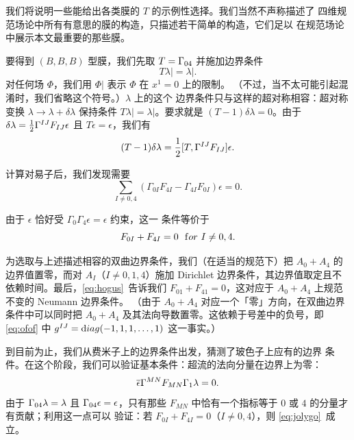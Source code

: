 我们将说明一些能给出各类膜的 $T$ 的示例性选择。我们当然不声称描述了
四维规范场论中所有有意思的膜的构造，只描述若干简单的构造，它们足以
在规范场论中展示本文最重要的那些膜。

要得到 $(B,B,B)$ 型膜，我们先取 $T=\G_{04}$ 并施加边界条件 %
\setcounter{equation}{8}
\begin{equation}\label{eq:unvu}
T\lambda\vert
=\lambda\vert.
\end{equation}
 对任何场 $\Phi$，我们用 $\Phi|$ 表示 $\Phi$ 在 $x^1=0$ 上的限制。
（不过，当不太可能引起混淆时，我们省略这个符号。）$\lambda$ 上的这个
边界条件只与这样的超对称相容：超对称变换
$\lambda\to \lambda+\delta\lambda$ 保持条件
$T\lambda\vert=\lambda\vert$。要求就是 $(T-1)\delta\lambda=0$。由于
$\delta\lambda=\half\G^{IJ}F_{IJ}\epsilon$ 且
$T\epsilon=\epsilon$，我们有 %
\setcounter{equation}{9}
\begin{equation}\label{eq:bogus}
(T-1)\delta\lambda =\half [T,\G^{IJ}F_{IJ}]\epsilon.
\end{equation}

计算对易子后，我们发现需要
\setcounter{equation}{10}
\begin{equation}\label{eq:nogus}
\sum_{I\not=0,4}(\Gamma_{0I}F_{4I}-\Gamma_{4I}F_{0I})\epsilon=0.
\end{equation}

由于 $\epsilon$ 恰好受 $\Gamma_0\Gamma_4\epsilon=\epsilon$ 约束，这一
条件等价于 %
\setcounter{equation}{11}
\begin{equation}\label{eq:hogus}
F_{0I}+F_{4I}=0~~{\rm for}~I\not=0,4.
\end{equation}

为选取与上述描述相容的双曲边界条件，我们（在适当的规范下）把
$A_0+A_4$ 的边界值置零，而对 $A_I$（$I\not= 0,1,4$）施加 Dirichlet
边界条件，其边界值取定且不依赖时间。最后，\eqref{eq:hogus}\ 告诉我们
$F_{01}+F_{41}=0$，这对应于 $A_0+A_4$ 上规范不变的 Neumann 边界条件。
（由于 $A_0+A_4$ 对应一个「零」方向，在双曲边界条件中可以同时把
$A_0+A_4$ 及其法向导数置零。这依赖于号差中的负号，即
\eqref{eq:ofof} 中 $g^{IJ}={\rm diag}(-1,1,1,\dots,1)$ 这一事实。）

到目前为止，我们从费米子上的边界条件出发，猜测了玻色子上应有的边界
条件。在这个阶段，我们可以验证基本条件：超流的法向分量在边界上为零：
\setcounter{equation}{12}
\begin{equation}\label{eq:jolygo}
{\bar\epsilon}\G^{MN}F_{MN}\G_1\lambda=0.
\end{equation}
 由于 $\G_{04}\lambda=\lambda$ 且 $\G_{04}\epsilon=\eps$，只有那些
$F_{MN}$ 中恰有一个指标等于 $0$ 或 $4$ 的分量才有贡献；利用这一点可以
验证：若 $F_{0I}+F_{4I}=0$（$I\not= 0,4$），则 \eqref{eq:jolygo}\ 成立。

